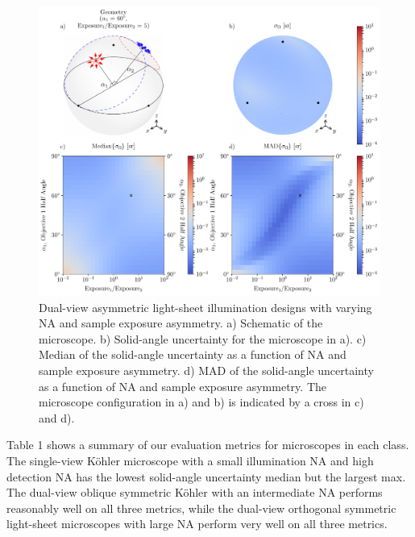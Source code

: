 \documentclass[10pt]{article}
\begin{document}
\begin{figure}[htbp]
  \centering\includegraphics[width=\textwidth]{asymmetric-double}
  \caption{Dual-view asymmetric light-sheet illumination designs with varying NA
    and sample exposure asymmetry. a) Schematic of the microscope. b)
    Solid-angle uncertainty for the microscope in a). c) Median of the
    solid-angle uncertainty as a function of NA and sample exposure
    asymmetry. d) MAD of the solid-angle uncertainty as a function of NA and
    sample exposure asymmetry. The microscope configuration in a) and b) is
    indicated by a cross in c) and d).}
\label{fig:asymmetric-double}
\end{figure}

Table 1 shows a summary of our evaluation metrics for microscopes in each
class. The single-view K\"ohler microscope with a small illumination NA and
high detection NA has the lowest solid-angle uncertainty median but the largest
max. The dual-view oblique symmetric K\"ohler with an intermediate NA performs
reasonably well on all three metrics, while the dual-view orthogonal symmetric
light-sheet microscopes with large NA perform very well on all three metrics.
\end{document}
